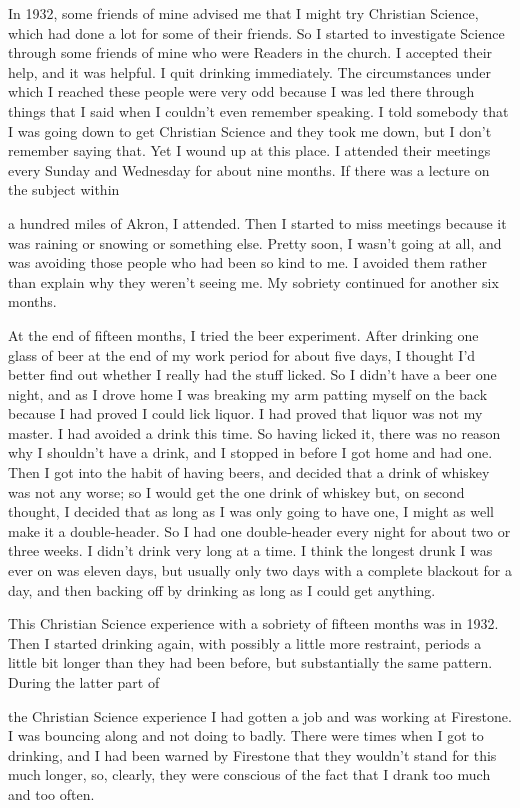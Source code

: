 \begin{biblechapter}
In 1932, some friends of mine advised me that I might try Christian Science, which had done a lot for some of their friends. So I started to investigate Science through some friends of mine who were Readers in the church. I accepted their help, and it was helpful. I quit drinking immediately. The circumstances under which I reached these people were very odd because I was led there through things that I said when I couldn’t even remember speaking. I told somebody that I was going down to get Christian Science and they took me down, but I don’t remember saying that. Yet I wound up at this place. I attended their meetings every Sunday and Wednesday for about nine months. If there was a lecture on the subject within

a hundred miles of Akron, I attended. Then I started to miss meetings because it was raining or snowing or something else. Pretty soon, I wasn’t going at all, and was avoiding those people who had been so kind to me. I avoided them rather than explain why they weren’t seeing me. My sobriety continued for another six months.

At the end of fifteen months, I tried the beer experiment. After drinking one glass of beer at the end of my work period for about five days, I thought I’d better find out whether I really had the stuff licked. So I didn’t have a beer one night, and as I drove home I was breaking my arm patting myself on the back because I had proved I could lick liquor. I had proved that liquor was not my master. I had avoided a drink this time. So having licked it, there was no reason why I shouldn’t have a drink, and I stopped in before I got home and had one. Then I got into the habit of having beers, and decided that a drink of whiskey was not any worse; so I would get the one drink of whiskey but, on second thought, I decided that as long as I was only going to have one, I might as well make it a double-header. So I had one double-header every night for about two or three weeks. I didn’t drink very long at a time. I think the longest drunk I was ever on was eleven days, but usually only two days with a complete blackout for a day, and then backing off by drinking as long as I could get anything.

This Christian Science experience with a sobriety of fifteen months was in 1932. Then I started drinking again, with possibly a little more restraint, periods a little bit longer than they had been before, but substantially the same pattern. During the latter part of

the Christian Science experience I had gotten a job and was working at Firestone. I was bouncing along and not doing to badly. There were times when I got to drinking, and I had been warned by Firestone that they wouldn’t stand for this much longer, so, clearly, they were conscious of the fact that I drank too much and too often.


\end{biblechapter}
